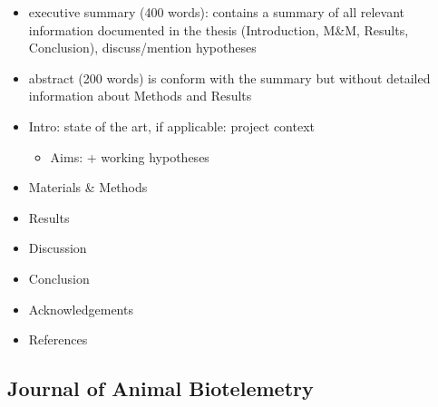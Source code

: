 \documentclass[
  authoryear,
  review,
  3p]{elsarticle}
\providecommand{\tightlist}{%
  \setlength{\itemsep}{0pt}\setlength{\parskip}{0pt}}\usepackage{longtable,booktabs,array}
\begin{document}
\begin{itemize}
\tightlist
\item
  executive summary (400 words): contains a summary of all relevant
  information documented in the thesis (Introduction, M\&M, Results,
  Conclusion), discuss/mention hypotheses
\item
  abstract (200 words) is conform with the summary but without detailed
  information about Methods and Results
\item
  Intro: state of the art, if applicable: project context

  \begin{itemize}
  \tightlist
  \item
    Aims: + working hypotheses
  \end{itemize}
\item
  Materials \& Methods
\item
  Results
\item
  Discussion
\item
  Conclusion
\item
  Acknowledgements
\item
  References
\end{itemize}

\hypertarget{journal-of-animal-biotelemetry}{%
\subsection*{Journal of Animal
Biotelemetry}\label{journal-of-animal-biotelemetry}}
\end{document}
